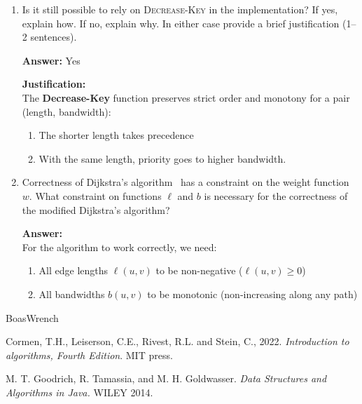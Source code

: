 \documentclass[dvipsnames]{article}
\begin{document}
\begin{enumerate}
\begin{enumerate}
    \item Is it still possible to rely on \textsc{Decrease-Key} in the implementation?
    If yes, explain how. If no, explain why. In either case provide a brief justification (1--2 sentences).

    \color{blue}
    \textbf{Answer:} Yes

    \textbf{Justification:} \\The \textbf{Decrease-Key} function preserves strict order and monotony for a pair (length, bandwidth):
\begin{enumerate}
    \item The shorter length takes precedence
    \item With the same length, priority goes to higher bandwidth.
\end{enumerate}
    \color{black}

    \item Correctness of Dijkstra's algorithm~\cite[Theorem~22.6]{Cormen2022} has a constraint on the weight function $w$.
      What constraint on functions $\ell$ and $b$ is necessary for the correctness of the modified Dijkstra's algorithm?

    \color{blue}
    \textbf{Answer:}\\
    For the algorithm to work correctly, we need:
    \begin{enumerate}
        \item All edge lengths $\ell(u,v)$ to be non-negative ($\ell(u,v) \geq 0$)
        \item All bandwidths $b(u,v)$ to be monotonic (non-increasing along any path)
    \end{enumerate}
    

    
    \color{black}
  \end{enumerate}
\end{enumerate}

\begin{thebibliography}{BoasWrench}

Cormen, T.H., Leiserson, C.E., Rivest, R.L. and Stein, C., 2022. \emph{Introduction to algorithms, Fourth Edition}. MIT press.

M. T. Goodrich, R. Tamassia, and M. H. Goldwasser. \emph{Data Structures and Algorithms in Java.} WILEY 2014.

\end{thebibliography}
\end{document}
